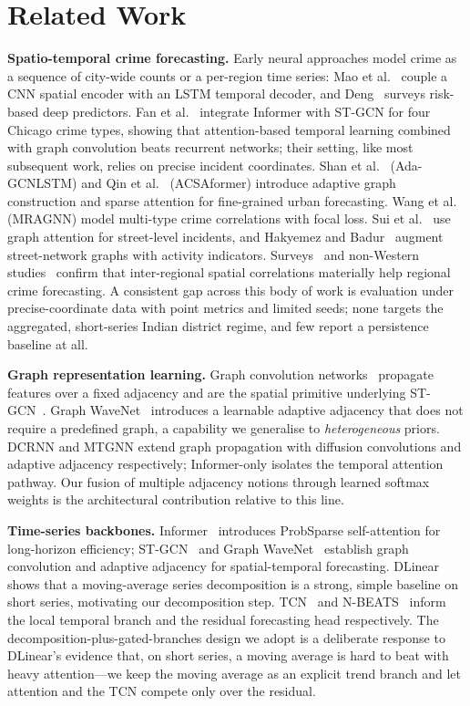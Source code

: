\documentclass[11pt,conference]{IEEEtran}
\begin{document}
\section{Related Work}\label{sec:related}
\textbf{Spatio-temporal crime forecasting.} Early neural approaches model
crime as a sequence of city-wide counts or a per-region time series:
Mao et al.~\cite{mao2025cnnlstm} couple a CNN spatial encoder with an LSTM
temporal decoder, and Deng~\cite{deng2023crimerisk} surveys risk-based deep
predictors. Fan et al.~\cite{fan2025informer} integrate Informer with ST-GCN
for four Chicago crime types, showing that attention-based temporal learning
combined with graph convolution beats recurrent networks; their setting, like
most subsequent work, relies on precise incident coordinates. Shan
et al.~\cite{shan2025adagnclstm} (Ada-GCNLSTM) and Qin
et al.~\cite{qin2025acsaformer} (ACSAformer) introduce adaptive graph
construction and sparse attention for fine-grained urban forecasting. Wang
et al.~\cite{wang2025mragnn} (MRAGNN) model multi-type crime correlations with
focal loss. Sui et al.~\cite{sui2024gat} use graph attention for street-level
incidents, and Hakyemez and Badur~\cite{hakyemez2023parkevents} augment
street-network graphs with activity indicators. Surveys~\cite{wang2023stgnn}
and non-Western studies~\cite{solis2024costarica} confirm that inter-regional
spatial correlations materially help regional crime forecasting. A consistent
gap across this body of work is evaluation under precise-coordinate data with
point metrics and limited seeds; none targets the aggregated, short-series
Indian district regime, and few report a persistence baseline at all.

\textbf{Graph representation learning.} Graph convolution
networks~\cite{kipf2017gcn} propagate features over a fixed adjacency and are
the spatial primitive underlying ST-GCN~\cite{yu2018stgcn}. Graph
WaveNet~\cite{wu2019graphwavenet} introduces a learnable adaptive adjacency
that does not require a predefined graph, a capability we generalise to
\emph{heterogeneous} priors. DCRNN and MTGNN extend graph propagation with
diffusion convolutions and adaptive adjacency respectively; Informer-only
isolates the temporal attention pathway. Our fusion of multiple adjacency
notions through learned softmax weights is the architectural contribution
relative to this line.

\textbf{Time-series backbones.} Informer~\cite{zhou2021informer} introduces
ProbSparse self-attention for long-horizon efficiency; ST-GCN~\cite{yu2018stgcn}
and Graph WaveNet~\cite{wu2019graphwavenet} establish graph convolution and
adaptive adjacency for spatial-temporal forecasting. DLinear~\cite{zeng2023dlinear}
shows that a moving-average series decomposition is a strong, simple baseline
on short series, motivating our decomposition step. TCN~\cite{bai2018tcn} and
N-BEATS~\cite{oreshkin2020nbeats} inform the local temporal branch and the
residual forecasting head respectively. The decomposition-plus-gated-branches
design we adopt is a deliberate response to DLinear's evidence that, on short
series, a moving average is hard to beat with heavy attention---we keep the
moving average as an explicit trend branch and let attention and the TCN
compete only over the residual.
\end{document}

